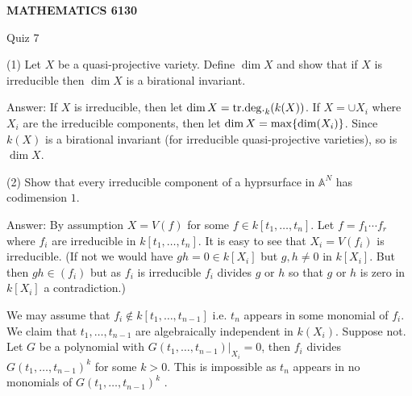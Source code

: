 \documentclass[12pt]{amsart}
\begin{document}
\bigskip\bigskip\bigskip\bigskip
\centerline{\bf MATHEMATICS 6130}
\centerline{Quiz 7}
(1) Let $X$ be a quasi-projective variety. Define $\dim X$ and show that if $X
$ is irreducible then $\dim X$ is a birational invariant.

Answer: If $X$ is irreducible, then let $\dim X={\rm tr.deg.}_k(k(X))$. If
$X=\cup X_i$ where $X_i$ are the irreducible components, then let $\dim X={\rm max}\{ \dim (X_i) \}$. Since $k(X)$ is a birational invariant (for irreducible quasi-projective varieties), so is $\dim X$.

(2) Show that every irreducible component of a hyprsurface in $\mathbb A ^N$ 
has codimension $1$.

Answer: By assumption $X=V(f)$ for some $f\in k[t_1,\ldots , t_n]$. Let $f=f_1\cdots f_r$ where $f_i$ are irreducible in $ k[t_1,\ldots , t_n]$.
It is easy to see that $X_i=V(f_i)$ is irreducible. 
(If not we would have $gh=0\in k[X_i]$ but $g,h\ne 0$ in $k[X_i]$. But then $gh\in (f_i)$ but as $f_i$ is irreducible $f_i$ divides $g$ or $h$ so that $g$ or $h$ is zero in  $k[X_i]$ a contradiction.)

We may assume that $f_i\not\in  k[t_1,\ldots , t_{n-1}]$ i.e. $t_n$ appears in some monomial of $f_i$. We claim that $t_1,\ldots , t_{n-1}$ are algebraically independent in $k(X_i)$. Suppose not. Let $G$ be a polynomial with $G(t_1, \ldots , t_{n-1})|_{X_i}=0$, then $f_i$ divides  $G(t_1, \ldots , t_{n-1})^k$ for some $k>0$. This is impossible as $t_n$ appears in no monomials of $G(t_1, \ldots , t_{n-1})^k$ .
\end{document}
